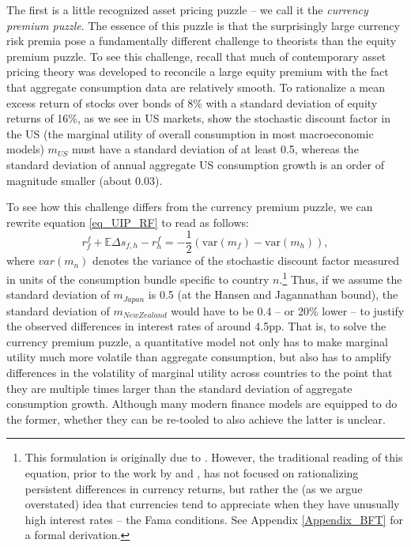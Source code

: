 \documentclass{ar-1col}
\begin{document}
The first is a little recognized asset pricing puzzle -- we call it the \textit{currency premium puzzle}. The essence of this puzzle is that the surprisingly large currency risk premia pose a fundamentally different challenge to theorists than the equity premium puzzle. To see this challenge, recall that much of contemporary asset pricing theory was developed to reconcile a large equity premium with the fact that aggregate consumption data are relatively smooth. To rationalize a mean excess return of stocks over bonds of 8\% with a standard deviation of equity returns of 16\%, as we see in US markets, \citet{HansenJagannathan1991} show the stochastic discount factor in the US (the marginal utility of overall consumption in most macroeconomic models) $m_{US}$ must have a standard deviation of at least 0.5, whereas the standard deviation of annual aggregate US consumption growth is an order of magnitude smaller (about 0.03).  

To see how this challenge differs from the currency premium puzzle, we can rewrite equation \ref{eq_UIP_RF} to read as follows: 
\begin{equation}\label{eq_BFT}
  r^f_f + \mathbb{E} \Delta s_{f,h} - r^f_h 
  =-\frac{1}{2}\left(\text{var}(m_f)- \text{var}(m_h)\right),
\end{equation} 
where $var(m_n)$ denotes the variance of the stochastic discount factor measured in units of the consumption bundle specific to country $n$.\footnote{This formulation is originally due to \cite{Backusetal2001}. However, the traditional reading of this equation, prior to the work by \cite{LustigRoussanovVerdelhan2011} and \cite{HassanMano2019}, has not focused on rationalizing persistent differences in currency returns, but rather the (as we argue overstated) idea that currencies tend to appreciate when they have unusually high interest rates -- the Fama conditions. See Appendix \ref{Appendix_BFT} for a formal derivation.} Thus, if we assume the standard deviation of $m_{Japan}$ is 0.5 (at the Hansen and Jagannathan bound), the standard deviation of $m_{New Zealand}$ would have to be 0.4 -- or 20\% lower -- to justify the observed differences in interest rates of around 4.5pp. That is, to solve the currency premium puzzle, a quantitative model not only has to make marginal utility much more volatile than aggregate consumption, but also has to amplify differences in the volatility of marginal utility across countries to the point that they are multiple times larger than the standard deviation of aggregate consumption growth. Although many modern finance models are equipped to do the former, whether they can be re-tooled to also achieve the latter is unclear. 
\end{document}
